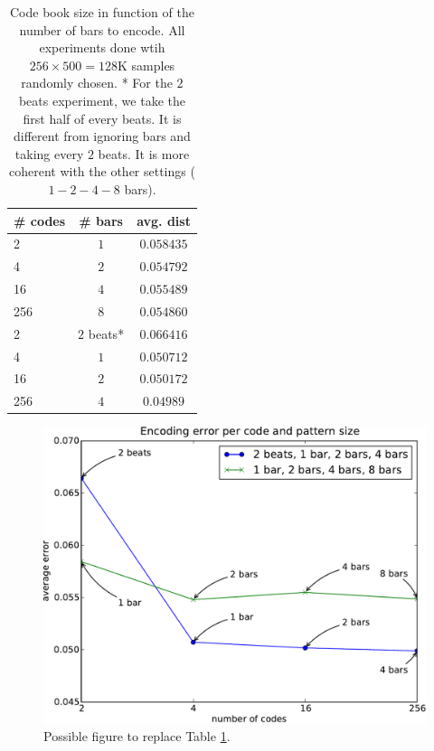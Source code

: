 \documentclass{article}
\begin{document}
\begin{table}
\begin{center}
\begin{tabular}{|l|c|c|}
\hline
\# codes & \# bars & avg. dist \\ \hline \hline
2 & $1$ & $0.058435$ \\
4 & $2$ & $0.054792$ \\
16 & $4$ & $0.055489$ \\
256 & $8$ & $0.054860$ \\ \hline
2 & $2$ beats* & $0.066416$ \\
4 & $1$ & $0.050712$ \\
16 & $2$ & $0.050172$ \\
256 & $4$ & $0.04989$ \\ \hline
\end{tabular}
\end{center}
\caption{{Code book size in function of the number of bars to encode.
All experiments done wtih $256 \times 500 = 128$K samples randomly chosen.
* For the $2$ beats experiment, we take the first half of every beats.
It is different from ignoring bars and taking every $2$ beats. It is more
coherent with the other settings ($1-2-4-8$ bars).}}
\label{tab:size_pattern}
\end{table}


\begin{figure}[htb]
\begin{center}
\includegraphics[width=.99\columnwidth]{codesize_patternsize}
\end{center}
\caption{{Possible figure to replace Table \ref{tab:size_pattern}.}}
\label{fig:size_pattern}
\end{figure}
\end{document}
